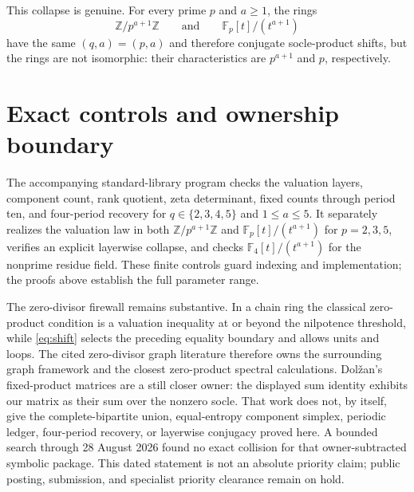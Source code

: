 \documentclass[11pt,a4paper]{amsart}
\theoremstyle{definition}
\theoremstyle{remark}
\newcommand{\Z}{\mathbb Z}
\newcommand{\F}{\mathbb F}
\begin{document}
This collapse is genuine.  For every prime $p$ and $a\geq1$, the rings
\[
 \Z/p^{a+1}\Z
 \qquad\text{and}\qquad
 \F_p[t]/(t^{a+1})
\]
have the same $(q,a)=(p,a)$ and therefore conjugate socle-product shifts,
but the rings are not isomorphic: their characteristics are $p^{a+1}$ and
$p$, respectively.

\section{Exact controls and ownership boundary}

The accompanying standard-library program checks the valuation layers,
component count, rank quotient, zeta determinant, fixed counts through period
ten, and four-period recovery for $q\in\{2,3,4,5\}$ and $1\leq a\leq5$.
It separately realizes the valuation law in both
$\Z/p^{a+1}\Z$ and $\F_p[t]/(t^{a+1})$ for $p=2,3,5$, verifies an explicit
layerwise collapse, and checks $\F_4[t]/(t^{a+1})$ for the nonprime residue
field.  These finite controls guard indexing and implementation; the proofs
above establish the full parameter range.

The zero-divisor firewall remains substantive.  In a chain ring the
classical zero-product condition is a valuation inequality at or beyond the
nilpotence threshold, while \eqref{eq:shift} selects the preceding equality
boundary and allows units and loops.  The cited zero-divisor graph literature
therefore owns the surrounding graph framework and the closest zero-product
spectral calculations.  Dol\v{z}an's fixed-product matrices are a still closer
owner: the displayed sum identity exhibits our matrix as their sum over the nonzero
socle.  That work does not, by itself, give the complete-bipartite union,
equal-entropy component simplex, periodic ledger, four-period recovery, or
layerwise conjugacy proved here.  A bounded search through 28 August 2026
found no exact collision for that owner-subtracted symbolic package.  This
dated statement is not an absolute priority claim; public posting, submission,
and specialist priority clearance remain on hold.



\end{document}
